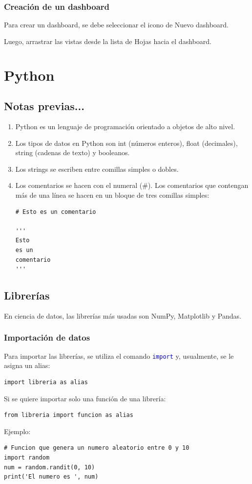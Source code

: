 \documentclass[a4paper, 12pt]{book}
\begin{document}
\subsection{Creación de un dashboard}
Para crear un dashboard, se debe seleccionar el icono de Nuevo dashboard.

Luego, arrastrar las vistas desde la lista de Hojas hacia el dashboard.

%
\chapter{Python}
\section{Notas previas...}
\begin{enumerate}
	\item Python es un lenguaje de programación orientado a objetos de alto nivel.
	\item Los tipos de datos en Python son int (números enteros), float (decimales), string (cadenas de texto) y booleanos.
	\item Los strings se escriben entre comillas simples o dobles.
	\item Los comentarios se hacen con el numeral ($\#$). Los comentarios que contengan más de una línea se hacen en un bloque de tres comillas simples:
	\begin{verbatim}
# Esto es un comentario
		
'''
Esto
es un
comentario
'''
	\end{verbatim}
\end{enumerate}

\section{Librerías}
En ciencia de datos, las librerías más usadas son NumPy, Matplotlib y Pandas.
\subsection{Importación de datos}
Para importar las librerías, se utiliza el comando \texttt{\textcolor{blue}{import}} y, usualmente, se le asigna un alias:
\begin{verbatim}
import libreria as alias
\end{verbatim}
Si se quiere importar solo una función de una librería:
\begin{verbatim}
from libreria import funcion as alias
\end{verbatim}
Ejemplo:
\begin{verbatim}
# Funcion que genera un numero aleatorio entre 0 y 10
import random
num = random.randit(0, 10)
print('El numero es ', num)
\end{verbatim}
\end{document}

